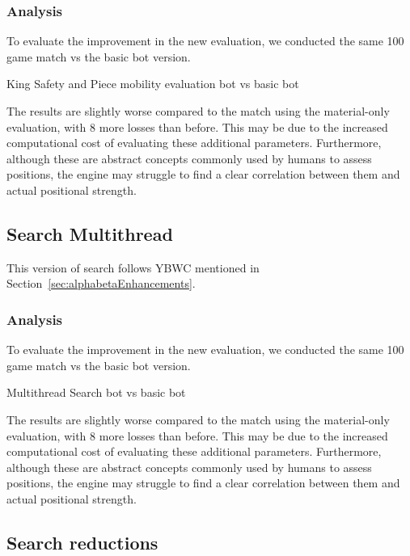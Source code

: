 \subsubsection{Analysis}

To evaluate the improvement in the new evaluation, we conducted the same 100 game match vs the basic bot version.

\vspace{1em}

King Safety and Piece mobility evaluation bot vs basic bot\\
\medskip

\noindent The results are slightly worse compared to the match using the material-only evaluation, with 8 more losses than before. This may be due to the increased computational cost of evaluating these additional parameters. Furthermore, although these are abstract concepts commonly used by humans to assess positions, the engine may struggle to find a clear correlation between them and actual positional strength.

\subsection{Search Multithread}

This version of search follows YBWC mentioned in Section~\ref{sec:alphabetaEnhancements}. 

\subsubsection{Analysis}

To evaluate the improvement in the new evaluation, we conducted the same 100 game match vs the basic bot version. 

\begin{center}
Multithread Search bot vs basic bot\\
\medskip
\end{center}

\noindent The results are slightly worse compared to the match using the material-only evaluation, with 8 more losses than before. This may be due to the increased computational cost of evaluating these additional parameters. Furthermore, although these are abstract concepts commonly used by humans to assess positions, the engine may struggle to find a clear correlation between them and actual positional strength.

\subsection{Search reductions}

